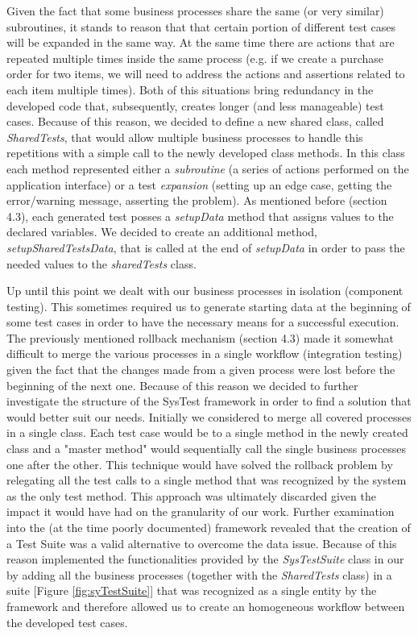 Given the fact that some business processes share the same (or very similar) subroutines, it stands to reason that that certain portion of different test cases will be expanded in the same way. At the same time there are actions that are repeated multiple times inside the same process (e.g. if we create a purchase order for two items, we will need to address the actions and assertions related to each item multiple times). Both of this situations bring redundancy in the developed code that, subsequently, creates longer (and less manageable) test cases. Because of this reason, we decided to define a new shared class, called \textit{SharedTests}, that would allow multiple business processes to handle this repetitions with a simple call to the newly developed class methods. In this class each method represented either a \textit{subroutine} (a series of actions performed on the application interface) or a test \textit{expansion} (setting up an edge case, getting the error/warning message, asserting the problem). As mentioned before (section 4.3), each generated test posses a \textit{setupData} method that assigns values to the declared variables. We decided to create an additional method, \textit{setupSharedTestsData}, that is called at the end of \textit{setupData} in order to pass the needed values to the \textit{sharedTests} class. 

Up until this point we dealt with our business processes in isolation (component testing). This sometimes required us to generate starting data at the beginning of some test cases in order to have the necessary means for a successful execution. The previously mentioned rollback mechanism (section 4.3) made it somewhat difficult to merge the various processes in a single workflow (integration testing) given the fact that the changes made from a given process were lost before the beginning of the next one. Because of this reason we decided to further investigate the structure of the SysTest framework in order to find a solution that would better suit our needs. Initially we considered to merge all covered processes in a single class. Each test case would be to a single method in the newly created class and a "master method" would sequentially call the single business processes one after the other. This technique would have solved the rollback problem by relegating all the test calls to a single method that was recognized by the system as the only test method. This approach was ultimately discarded given the impact it would have had on the granularity of our work. Further examination into the (at the time poorly documented) framework revealed that the creation of a Test Suite was a valid alternative to overcome the data issue. Because of this reason implemented the functionalities provided by the \textit{SysTestSuite} class in our by adding all the business processes (together with the \textit{SharedTests} class) in a suite [Figure \ref{fig:syTestSuite}] that was recognized as a single entity by the framework and therefore allowed us to create an homogeneous workflow between the developed test cases.

